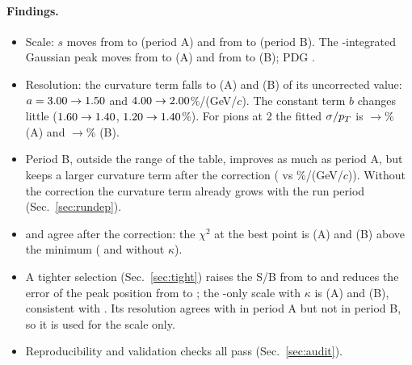 \paragraph{Findings.}
\begin{itemize}
\item Scale: $s$ moves from \PerARawKsS{} to \PerAKapKsS{} (period A) and from \PerBRawKsS{} to \PerBKapKsS{} (period B). The
  \pt-integrated \Ks{} Gaussian peak moves from \PerARawKsGM{} to \PerAKapKsGM\mevcc{} (A) and from \PerBRawKsGM{} to
  \PerBKapKsGM\mevcc{} (B); PDG \PdgKs\mevcc.
\item Resolution: the curvature term falls to \PerAARatio{} (A) and \PerBARatio{} (B) of its uncorrected value:
  $a=3.00\to1.50$ and $4.00\to2.00$\%/(GeV/$c$). The constant term $b$ changes little
  ($1.60\to1.40$, $1.20\to1.40$\%). For pions at 2\gevc{} the fitted $\sigma/p_T$ is
  \PerARawResPiTwo$\to$\PerAKapResPiTwo\% (A) and \PerBRawResPiTwo$\to$\PerBKapResPiTwo\% (B).
\item Period B, outside the range of the table, improves as much as period A, but keeps a larger curvature term after the
  correction (\PerBKapKsA{} vs \PerAKapKsA\%/(GeV/$c$)). Without the correction the curvature term already grows with the
  run period (Sec.~\ref{sec:rundep}).
\item \Ks{} and \La{} agree after the correction: the \La{} $\chi^2$ at the \Ks{} best point is \PerAKapDchiLa{} (A) and
  \PerBKapDchiLa{} (B) above the \La{} minimum (\PerARawDchiLa{} and \PerBRawDchiLa{} without $\kappa$).
\item A tighter \La{} selection (Sec.~\ref{sec:tight}) raises the \La{} S/B from \PerAllKapLpQaSB{} to \PerAllKapLpTiSB{} and reduces
  the error of the \La{} peak position from \PerAllKapLpQaMe{} to \PerAllKapLpTiMe\mevcc; the \La-only scale with $\kappa$ is
  \PerAKapTiLaS{} (A) and \PerBKapTiLaS{} (B), consistent with \Ks. Its \La{} resolution agrees with \Ks{} in period A but not in
  period B, so it is used for the scale only.
\item Reproducibility and validation checks all pass (Sec.~\ref{sec:audit}).
\end{itemize}

